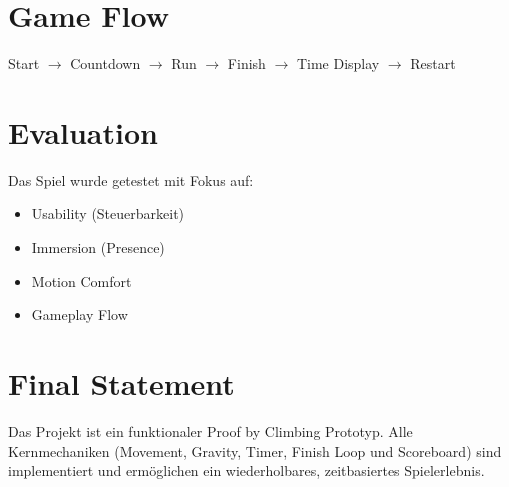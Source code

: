 \documentclass[11pt,a4paper]{article}
\begin{document}
\section{Game Flow}

\begin{center}
    \large
    Start $\rightarrow$ Countdown $\rightarrow$ Run $\rightarrow$ Finish $\rightarrow$ Time Display $\rightarrow$ Restart
\end{center}

\section{Evaluation}

Das Spiel wurde getestet mit Fokus auf:

\begin{itemize}
    \item Usability (Steuerbarkeit)
    \item Immersion (Presence)
    \item Motion Comfort
    \item Gameplay Flow
\end{itemize}

\section{Final Statement}

Das Projekt ist ein funktionaler Proof by Climbing Prototyp. Alle Kernmechaniken (Movement, Gravity, Timer, Finish Loop und Scoreboard) sind implementiert und ermöglichen ein wiederholbares, zeitbasiertes Spielerlebnis.
\end{document}
